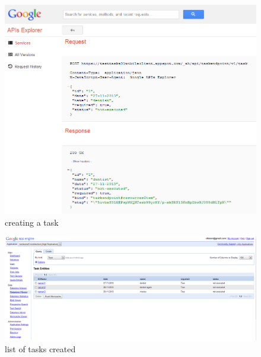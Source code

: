 \begin{figure}[H]
	\centering
	\includegraphics[scale=0.7]{images/googlecloud__createtask.png}
	\caption{creating a task}
	\label{mobile_json_figure}
\end{figure}
\begin{figure}[H]
	\centering
	\includegraphics[scale=0.5]{images/googlecloud__taskexist.png}
	\caption{list of tasks created}
	\label{mobile_task_list_figure}
\end{figure}

